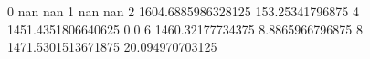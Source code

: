 0 nan nan
1 nan nan
2 1604.6885986328125 153.25341796875
4 1451.4351806640625 0.0
6 1460.32177734375 8.8865966796875
8 1471.5301513671875 20.094970703125
